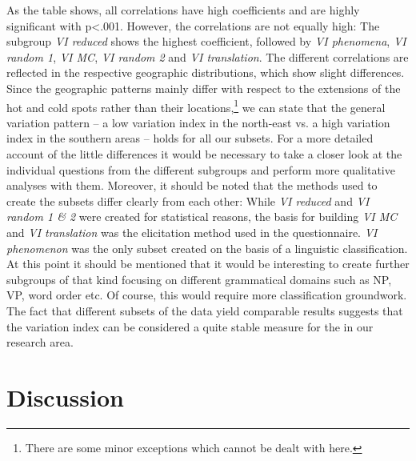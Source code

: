 \documentclass[output=paper]{LSP/langsci}
\begin{document}
As the table shows, all correlations have high coefficients and are highly significant with p{\textless}.001. However, the correlations are not equally high: The subgroup \emph{VI reduced} shows the highest coefficient, followed by \emph{VI phenomena}, \emph{VI random 1}, \emph{VI MC}, \emph{VI random 2} and \emph{VI translation}. The different correlations are reflected in the respective geographic distributions, which show slight differences. Since the geographic patterns mainly differ with respect to the extensions of the hot and cold spots rather than their locations,\footnote{There are some minor exceptions which cannot be dealt with here.} we can state that the general variation pattern – a low variation index in the north-east vs. a high variation index in the southern areas – holds for all our subsets. For a more detailed account of the little differences it would be necessary to take a closer look at the individual questions from the different subgroups and perform more qualitative analyses with them. Moreover, it should be noted that the methods used to create the subsets differ clearly from each other: While \emph{VI reduced} and \emph{VI random 1 \& 2} were created for statistical reasons, the basis for building \emph{VI MC} and \emph{VI translation} was the elicitation method used in the questionnaire. \emph{VI phenomenon }was the only subset created on the basis of a linguistic classification. At this point it should be mentioned that it would be interesting to create further subgroups of that kind focusing on different grammatical domains such as NP, VP, word order etc. Of course, this would require more classification groundwork. The fact that different subsets of the data yield comparable results suggests that the variation index can be considered a quite stable measure for the  in our research area.

\section{Discussion}
\end{document}
